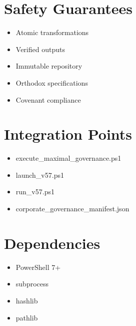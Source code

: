 \documentclass[12pt]{article}
\begin{document}
\section{Safety Guarantees}

\begin{itemize}
    \item Atomic transformations
    \item Verified outputs
    \item Immutable repository
    \item Orthodox specifications
    \item Covenant compliance
\end{itemize}

\section{Integration Points}

\begin{itemize}
    \item execute_maximal_governance.ps1
    \item launch_v57.ps1
    \item run_v57.ps1
    \item corporate_governance_manifest.json
\end{itemize}

\section{Dependencies}

\begin{itemize}
    \item PowerShell 7+
    \item subprocess
    \item hashlib
    \item pathlib
\end{itemize}
\end{document}
